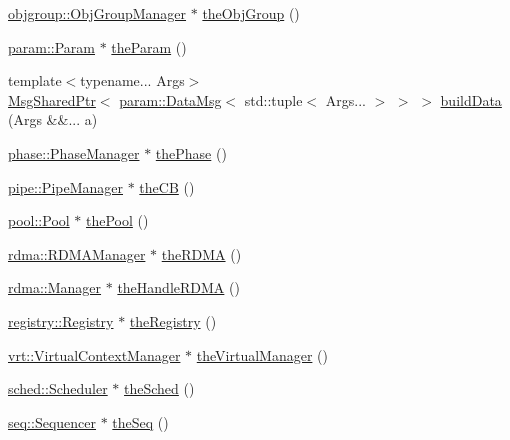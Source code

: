 \begin{DoxyCompactItemize}
\hyperlink{structvt_1_1objgroup_1_1_obj_group_manager}{objgroup\+::\+Obj\+Group\+Manager} $\ast$ \hyperlink{namespacevt_a833f0115b692f578167cbd88e30d39c5}{the\+Obj\+Group} ()
\item 
\hyperlink{structvt_1_1param_1_1_param}{param\+::\+Param} $\ast$ \hyperlink{namespacevt_a268431014c9031c0f7c33d32c1b8645c}{the\+Param} ()
\item 
{\footnotesize template$<$typename... Args$>$ }\\\hyperlink{namespacevt_ab2b3d506ec8e8d1540aede826d84a239}{Msg\+Shared\+Ptr}$<$ \hyperlink{structvt_1_1param_1_1_data_msg}{param\+::\+Data\+Msg}$<$ std\+::tuple$<$ Args... $>$ $>$ $>$ \hyperlink{namespacevt_a59494f92a4811ae4f2b5264a50aa78dd}{build\+Data} (Args \&\&... a)
\item 
\hyperlink{structvt_1_1phase_1_1_phase_manager}{phase\+::\+Phase\+Manager} $\ast$ \hyperlink{namespacevt_a3799d6b51fb71d7b6505760aad457e61}{the\+Phase} ()
\item 
\hyperlink{structvt_1_1pipe_1_1_pipe_manager}{pipe\+::\+Pipe\+Manager} $\ast$ \hyperlink{namespacevt_a673b109e94c7bca58313504c83e1da94}{the\+CB} ()
\item 
\hyperlink{structvt_1_1pool_1_1_pool}{pool\+::\+Pool} $\ast$ \hyperlink{namespacevt_aab3530d89a64e5ea903b0ccf303ecbb7}{the\+Pool} ()
\item 
\hyperlink{structvt_1_1rdma_1_1_r_d_m_a_manager}{rdma\+::\+R\+D\+M\+A\+Manager} $\ast$ \hyperlink{namespacevt_a68b8410bc2b86d3b5228d7dbb6b40bac}{the\+R\+D\+MA} ()
\item 
\hyperlink{structvt_1_1rdma_1_1_manager}{rdma\+::\+Manager} $\ast$ \hyperlink{namespacevt_aecb87ec2c40b5b7fc57ba4cf8ea838b0}{the\+Handle\+R\+D\+MA} ()
\item 
\hyperlink{structvt_1_1registry_1_1_registry}{registry\+::\+Registry} $\ast$ \hyperlink{namespacevt_a8b5994a5aedabc64006ce820db2e938c}{the\+Registry} ()
\item 
\hyperlink{structvt_1_1vrt_1_1_virtual_context_manager}{vrt\+::\+Virtual\+Context\+Manager} $\ast$ \hyperlink{namespacevt_ad46b232b74b745991314a4a509c648f9}{the\+Virtual\+Manager} ()
\item 
\hyperlink{structvt_1_1sched_1_1_scheduler}{sched\+::\+Scheduler} $\ast$ \hyperlink{namespacevt_a4508b38e6ab664b64f1415aecbb83571}{the\+Sched} ()
\item 
\hyperlink{structvt_1_1seq_1_1_sequencer}{seq\+::\+Sequencer} $\ast$ \hyperlink{namespacevt_a4a7d07c845b311da59286de486d623c7}{the\+Seq} ()
\item 

\end{DoxyCompactItemize}
